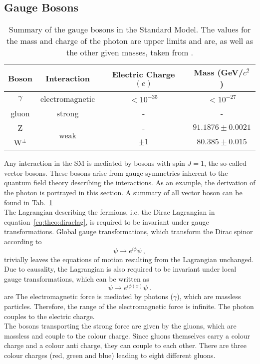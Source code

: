 \subsection{Gauge Bosons}
\begin{table}[b]
	\centering
	\caption[Summary of the gauge bosons in the Standard Model.]{Summary of the gauge bosons in the Standard Model. The values for the mass and charge of the photon are upper limits and are, as well as the other given masses, taken from \cite{SMmasses}.}
	\label{tab:theo:bosons}
	\begin{tabular}{cccc}
	\hline
	Boson & Interaction & Electric Charge $(e)$ & Mass (GeV/$c^2$) \\
	\hline
	$\gamma$ & electromagnetic & $<10^{-35}$ & $<10^{-27}$ \\
	gluon & strong & - & - \\
	Z & \multirow{2}{*}{weak} & - & $91.1876 \pm 0.0021$ \\
	W$^\pm$ & & $\pm 1$ & $80.385 \pm 0.015$ \\
	\hline
	\end{tabular}
\end{table}
Any interaction in the SM is mediated by bosons with spin $J=1$, the so-called vector bosons. These bosons arise from gauge symmetries inherent to the quantum field theory describing the interactions. As an example, the derivation of the photon is portrayed in this section. A summary of all vector boson can be found in Tab.~\ref{tab:theo:bosons}\\
The Lagrangian describing the fermions, i.e. the Dirac Lagrangian in equation~\ref{eq:theo:diraclag}, is required to be invariant under gauge transformations. Global gauge transformations, which transform the Dirac spinor according to
\begin{equation}
\psi\rightarrow e^{i\phi}\psi ~,
\end{equation}
trivially leaves the equations of motion resulting from the Lagrangian unchanged. Due to causality, the Lagrangian is also required to be invariant under local gauge transformations, which can be written as
\begin{equation}
\psi\rightarrow e^{i\phi(x)}\psi ~.
\end{equation} 
  are  
The electromagnetic force is mediated by photons ($\gamma$), which are massless particles. Therefore, the range of the electromagnetic force is infinite. The photon couples to the electric charge.\\
The bosons transporting the strong force are given by the gluons, which are massless and couple to the colour charge. Since gluons themselves carry a colour charge and a colour anti charge, they can couple to each other. There are three colour charges (red, green and blue) leading to eight different gluons.\\
